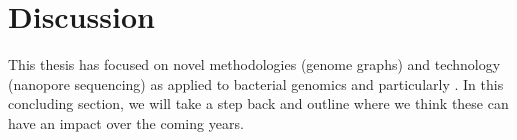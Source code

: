 \chapter*{Discussion}
 
\label{chap:conclusion}



This thesis has focused on novel methodologies (genome graphs) and technology (nanopore sequencing) as applied to bacterial genomics and particularly \mtb{}. In this concluding section, we will take a step back and outline where we think these can have an impact over the coming years.

\hspace{0.5cm}


